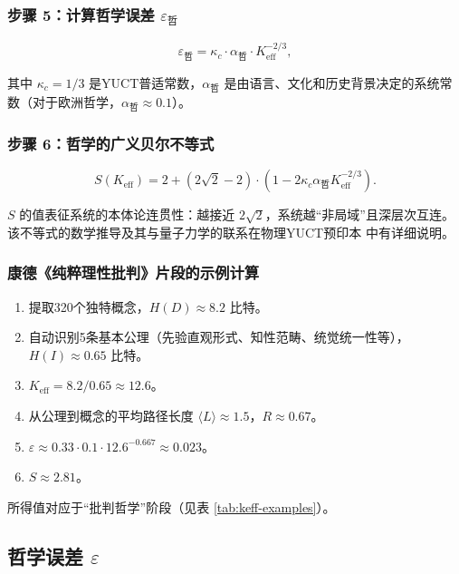 \documentclass[11pt,a4paper]{article}
\newcommand{\kappac}{\kappa_c}
\newcommand{\eps}{\varepsilon}
\begin{document}
	\subsubsection{步骤 5：计算哲学误差 \(\eps_{\text{哲}}\)}
	
	\[
	\eps_{\text{哲}} = \kappac \cdot \alpha_{\text{哲}} \cdot K_{\mathrm{eff}}^{-2/3},
	\]
	
	其中 \(\kappac = 1/3\) 是YUCT普适常数，\(\alpha_{\text{哲}}\) 是由语言、文化和历史背景决定的系统常数（对于欧洲哲学，\(\alpha_{\text{哲}} \approx 0.1\)）。
	
	\subsubsection{步骤 6：哲学的广义贝尔不等式}
	
	\[
	S(K_{\mathrm{eff}}) = 2 + (2\sqrt{2} - 2) \cdot \left(1 - 2\kappac \alpha_{\text{哲}} K_{\mathrm{eff}}^{-2/3}\right).
	\]
	
	\(S\) 的值表征系统的本体论连贯性：越接近 \(2\sqrt{2}\)，系统越“非局域”且深层次互连。该不等式的数学推导及其与量子力学的联系在物理YUCT预印本 \cite{Yakushev2026b} 中有详细说明。
	
	\subsubsection{康德《纯粹理性批判》片段的示例计算}
	
	\begin{enumerate}
		\item 提取320个独特概念，\(H(D) \approx 8.2\) 比特。
		\item 自动识别5条基本公理（先验直观形式、知性范畴、统觉统一性等），\(H(I) \approx 0.65\) 比特。
		\item \(K_{\mathrm{eff}} = 8.2 / 0.65 \approx 12.6\)。
		\item 从公理到概念的平均路径长度 \(\langle L \rangle \approx 1.5\)，\(R \approx 0.67\)。
		\item \(\eps \approx 0.33 \cdot 0.1 \cdot 12.6^{-0.667} \approx 0.023\)。
		\item \(S \approx 2.81\)。
	\end{enumerate}
	
	所得值对应于“批判哲学”阶段（见表 \ref{tab:keff-examples}）。
	
	
	\subsection{哲学误差 \texorpdfstring{\(\eps\)}{epsilon}}
	
\end{document}
